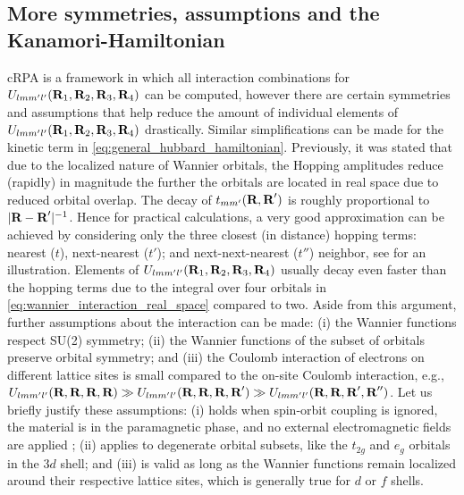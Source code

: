 \documentclass[../../main.tex]{subfiles}
\begin{document}
\subsection{More symmetries, assumptions and the Kanamori-Hamiltonian}

cRPA is a framework in which all interaction combinations for $U_{lmm'l'}(\textbf{R}_1,\textbf{R}_2,\textbf{R}_3,\textbf{R}_4)$ can be computed, however there are certain symmetries and assumptions that help reduce the amount of individual elements of $U_{lmm'l'}(\textbf{R}_1,\textbf{R}_2,\textbf{R}_3,\textbf{R}_4)$ drastically. Similar simplifications can be made for the kinetic term in \eqref{eq:general_hubbard_hamiltonian}. Previously, it was stated that due to the localized nature of Wannier orbitals, the Hopping amplitudes reduce (rapidly) in magnitude the further the orbitals are located in real space due to reduced orbital overlap. The decay of $t_{mm'}(\textbf{R},\textbf{R}')$ is roughly proportional to $|\textbf{R}-\textbf{R}'|^{-1}$. Hence for practical calculations, a very good approximation can be achieved by considering only the three closest (in distance) hopping terms: nearest ($t$), next-nearest ($t'$); and next-next-nearest ($t''$) neighbor, see  for an illustration. Elements of $U_{lmm'l'}(\textbf{R}_1,\textbf{R}_2,\textbf{R}_3,\textbf{R}_4)$ usually decay even faster than the hopping terms due to the integral over four orbitals in \eqref{eq:wannier_interaction_real_space} compared to two. Aside from this argument, further assumptions about the interaction can be made: (i) the Wannier functions respect SU(2) symmetry; (ii) the Wannier functions of the subset of orbitals preserve orbital symmetry; and (iii) the Coulomb interaction of electrons on different lattice sites is small compared to the on-site Coulomb interaction, e.g., $U_{lmm'l'}(\textbf{R},\textbf{R},\textbf{R},\textbf{R})\gg U_{lmm'l'}(\textbf{R},\textbf{R},\textbf{R},\textbf{R}')\gg U_{lmm'l'}(\textbf{R},\textbf{R},\textbf{R}',\textbf{R}'')$. Let us briefly justify these assumptions: (i) holds when spin-orbit coupling is ignored, the material is in the paramagnetic phase, and no external electromagnetic fields are applied \cite{georges hund}; (ii) applies to degenerate orbital subsets, like the $t_{2g}$ and $e_g$ orbitals in the $3d$ shell; and (iii) is valid as long as the Wannier functions remain localized around their respective lattice sites, which is generally true for $d$ or $f$ shells.
\end{document}
